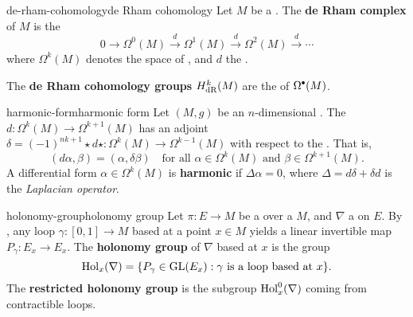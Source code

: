     

\begin{topic}{de-rham-cohomology}{de Rham cohomology}
    Let $M$ be a . The \textbf{de Rham complex} of $M$ is the 
    \[ 0 \to \Omega^0(M) \xrightarrow{d} \Omega^1(M) \xrightarrow{d} \Omega^2(M) \xrightarrow{d} \cdots \]
    where $\Omega^k(M)$ denotes the space of , and $d$ the .
    
    The \textbf{de Rham cohomology groups} $H_\textup{dR}^k(M)$ are the  of $\Omega^\bdot(M)$.
\end{topic}

\begin{topic}{harmonic-form}{harmonic form}
    Let $(M, g)$ be an $n$-dimensional . The  $d : \Omega^k(M) \to \Omega^{k + 1}(M)$ has an adjoint $\delta = (-1)^{nk + 1} \star d \star : \Omega^k(M) \to \Omega^{k - 1}(M)$ with respect to the . That is,
    \[ (d \alpha, \beta) = (\alpha, \delta \beta) \quad \text{for all } \alpha \in \Omega^k(M) \text{ and } \beta \in \Omega^{k + 1}(M) . \]
    A differential form $\alpha \in \Omega^k(M)$ is \textbf{harmonic} if $\Delta \alpha = 0$, where $\Delta = d \delta + \delta d$ is the \textit{Laplacian operator}.
\end{topic}

\begin{topic}{holonomy-group}{holonomy group}
    Let $\pi : E \to M$ be a  over a  $M$, and $\nabla$ a  on $E$. By , any loop $\gamma : [0, 1] \to M$ based at a point $x \in M$ yields a linear invertible map $P_\gamma : E_x \to E_x$. The \textbf{holonomy group} of $\nabla$ based at $x$ is the group
    \[ \textup{Hol}_x(\nabla) = \{ P_\gamma \in \textup{GL}(E_x) : \gamma \text{ is a loop based at } x \} . \]
    The \textbf{restricted holonomy group} is the subgroup $\textup{Hol}_x^0(\nabla)$ coming from contractible loops.
\end{topic}

